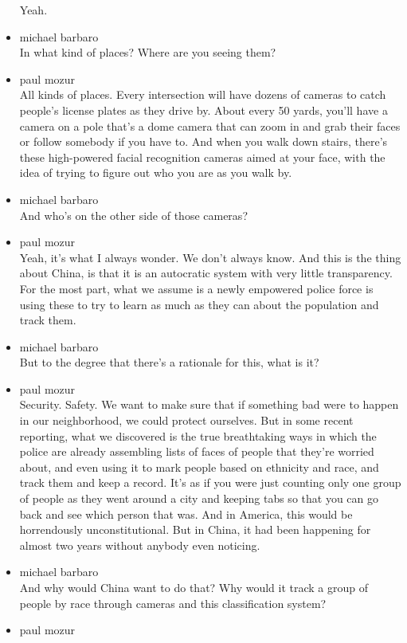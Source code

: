 \begin{itemize}
  Yeah.
\item
  michael barbaro\\
  In what kind of places? Where are you seeing them?
\item
  paul mozur\\
  All kinds of places. Every intersection will have dozens of cameras to
  catch people's license plates as they drive by. About every 50 yards,
  you'll have a camera on a pole that's a dome camera that can zoom in
  and grab their faces or follow somebody if you have to. And when you
  walk down stairs, there's these high-powered facial recognition
  cameras aimed at your face, with the idea of trying to figure out who
  you are as you walk by.
\item
  michael barbaro\\
  And who's on the other side of those cameras?
\item
  paul mozur\\
  Yeah, it's what I always wonder. We don't always know. And this is the
  thing about China, is that it is an autocratic system with very little
  transparency. For the most part, what we assume is a newly empowered
  police force is using these to try to learn as much as they can about
  the population and track them.
\item
  michael barbaro\\
  But to the degree that there's a rationale for this, what is it?
\item
  paul mozur\\
  Security. Safety. We want to make sure that if something bad were to
  happen in our neighborhood, we could protect ourselves. But in some
  recent reporting, what we discovered is the true breathtaking ways in
  which the police are already assembling lists of faces of people that
  they're worried about, and even using it to mark people based on
  ethnicity and race, and track them and keep a record. It's as if you
  were just counting only one group of people as they went around a city
  and keeping tabs so that you can go back and see which person that
  was. And in America, this would be horrendously unconstitutional. But
  in China, it had been happening for almost two years without anybody
  even noticing.
\item
  michael barbaro\\
  And why would China want to do that? Why would it track a group of
  people by race through cameras and this classification system?
\item
  paul mozur\\

\end{itemize}
